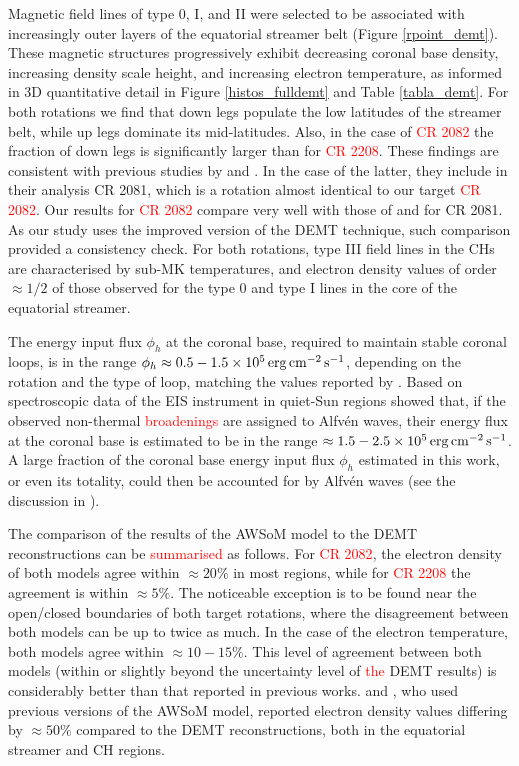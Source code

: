 \documentclass[namedreferences]{solarphysics}
\def\edit#1{\textcolor{Red}{#1}}
\newcommand{\cm}{{\rm cm}}
\newcommand{\cminvs}{\cm^{-2}}
\newcommand{\erg}{{\rm erg}}
\newcommand{\s}{{\rm s}}
\begin{document}
\begin{article}
{Magnetic field lines of type 0, I, and II were selected to be associated with increasingly outer layers of the equatorial streamer belt (Figure \ref{rpoint_demt}). These magnetic structures progressively exhibit decreasing coronal base density, increasing density scale height, and increasing electron temperature, as informed in 3D quantitative detail in Figure \ref{histos_fulldemt} and Table \ref{tabla_demt}.} For both rotations we find that down legs populate the low latitudes of the streamer belt, while up legs dominate its mid-latitudes. Also, in the case of \edit{CR 2082} the fraction of down legs is significantly larger than for \edit{CR 2208}. These findings are consistent with previous studies by \citet{huang_2012} and \citet{nuevo_2013}. In the case of the latter, they include in their analysis CR 2081, which is a rotation almost identical to our target \edit{CR 2082}. Our results for \edit{CR 2082} compare very well with those of \citet{nuevo_2015} and \citet{lloveras_2017} for CR 2081. As our study uses the improved version of the DEMT technique, such comparison provided a consistency {check.} {For both rotations, type III field lines in the CHs are characterised by sub-MK temperatures, and electron density values of order $\approx 1/2$ of those observed for the type 0 and type I lines in the core of the equatorial streamer.}

{The energy input flux $\phi_h$ at the coronal base, required to maintain stable coronal loops, is in the range} $\phi_h\approx 0.5-1.5 \times 10^5\,\erg\,\cminvs\,\s^{-1}$, depending on the rotation and the type of {loop, matching the values reported by} \citet{maccormack_2017}. Based on spectroscopic data of the EIS instrument in quiet-Sun regions \citet{hahn_2014} showed that, if the observed non-thermal \edit{broadenings} are assigned to Alfvén waves, their energy flux at the coronal base is estimated to be in the range $\approx 1.5-2.5\times 10^5\,\erg\,\cminvs\,\s^{-1}$. A large fraction of the coronal base energy input flux $\phi_h$ estimated in this work, or even its totality, could then be accounted for by Alfvén waves (see the discussion in \citealt{maccormack_2017}).

{The comparison of the results of the AWSoM model to the DEMT reconstructions can be \edit{summarised} as follows.} For \edit{CR 2082}, the electron density of both models agree within $\approx 20\%$ {in most regions}, while for \edit{CR 2208} the agreement is within $\approx 5\%$. {The noticeable exception is to be found near the open/closed boundaries of both target rotations, where the disagreement between both models can be up to twice as much.} In the case of the electron temperature, both models agree within $\approx 10-15\%$. This level of agreement between both models {(within or slightly beyond the uncertainty level of \edit{the} DEMT results)} is considerably better than that reported in previous works. \citet{jin_2012} and \citet{oran_2015}{, who used previous versions of the AWSoM model,} reported electron density values {differing by $\approx 50\%$ compared to the DEMT reconstructions, both in the equatorial streamer and CH regions.} 


\end{article}
\end{document}
